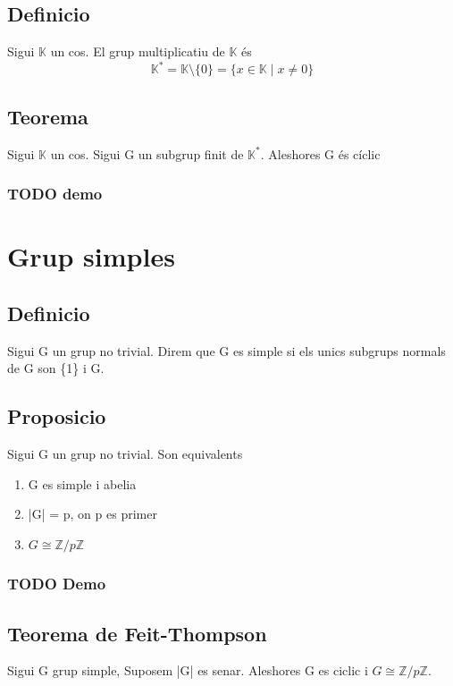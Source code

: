 \documentclass[11pt]{article}
\begin{document}
\subsection{Definicio}
\label{sec:org725ce93}
Sigui \(\mathbb{K}\) un cos. El grup multiplicatiu de \(\mathbb{K}\) és \\
\begin{equation*}
\mathbb{K}^* = \mathbb{K} \setminus \{0\} = \{x \in \mathbb{K} \mid x \neq 0\}
\end{equation*}

\subsection{Teorema}
\label{sec:org36d75b9}
Sigui \(\mathbb{K}\) un cos. Sigui G un subgrup finit de \(\mathbb{K}^*\). Aleshores G és cíclic

\subsubsection{{\bfseries\sffamily TODO} demo}
\label{sec:org5059f11}

\section{Grup simples}
\label{sec:org6302674}
\subsection{Definicio}
\label{sec:orgba15b2f}
Sigui G un grup no trivial. Direm que G es simple si els unics subgrups normals de G son \{1\} i G.
\subsection{Proposicio}
\label{sec:org3f658bb}
Sigui G un grup no trivial. Son equivalents
\begin{enumerate}
\item G es simple i abelia
\item |G| = p, on p es primer
\item \(G \cong \mathbb{Z}/p\mathbb{Z}\)
\end{enumerate}

\subsubsection{{\bfseries\sffamily TODO} Demo}
\label{sec:org87db5f7}
\subsection{Teorema de Feit-Thompson}
\label{sec:orgd59edd5}
Sigui G grup simple, Suposem |G| es senar. Aleshores G es ciclic i \(G \cong \mathbb{Z}/p\mathbb{Z}\).
\end{document}
